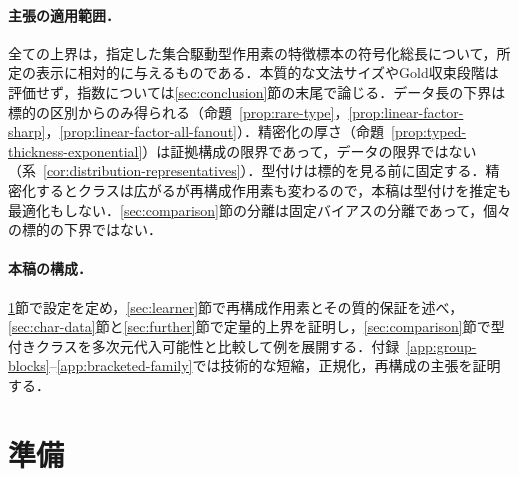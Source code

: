 \documentclass[11pt,a4paper]{ltjsarticle}
\numberwithin{equation}{section}
\theoremstyle{plain}
\theoremstyle{definition}
\theoremstyle{remark}
\begin{document}
\paragraph{主張の適用範囲．}
全ての上界は，指定した集合駆動型作用素の特徴標本の符号化総長について，所定の表示に相対的に与えるものである．本質的な文法サイズやGold収束段階は評価せず，指数については\ref{sec:conclusion}節の末尾で論じる．データ長の下界は標的の区別からのみ得られる（命題~\ref{prop:rare-type}，\ref{prop:linear-factor-sharp}，\ref{prop:linear-factor-all-fanout}）．精密化の厚さ（命題~\ref{prop:typed-thickness-exponential}）は証拠構成の限界であって，データの限界ではない（系~\ref{cor:distribution-representatives}）．型付けは標的を見る前に固定する．精密化するとクラスは広がるが再構成作用素も変わるので，本稿は型付けを推定も最適化もしない．\ref{sec:comparison}節の分離は固定バイアスの分離であって，個々の標的の下界ではない．

\paragraph{本稿の構成．}
\ref{sec:prelim}節で設定を定め，\ref{sec:learner}節で再構成作用素とその質的保証を述べ，\ref{sec:char-data}節と\ref{sec:further}節で定量的上界を証明し，\ref{sec:comparison}節で型付きクラスを多次元代入可能性と比較して例を展開する．付録~\ref{app:group-blocks}--\ref{app:bracketed-family}では技術的な短縮，正規化，再構成の主張を証明する．

\section{準備}
\label{sec:prelim}
\end{document}
